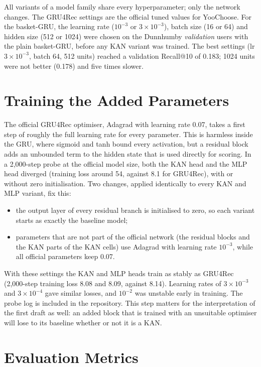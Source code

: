 All variants of a model family share every hyperparameter; only the network
changes. The GRU4Rec settings are the official tuned values for YooChoose. For
the basket-GRU, the learning rate ($10^{-3}$ or $3\times10^{-3}$), batch size (16
or 64) and hidden size (512 or 1024) were chosen on the Dunnhumby
\emph{validation} users with the plain basket-GRU, before any KAN variant was
trained. The best settings (lr $3\times10^{-3}$, batch 64, 512 units) reached a
validation Recall@10 of 0.183; 1024 units were not better (0.178) and five times
slower.

\section{Training the Added Parameters}
\label{sec:stability}

The official GRU4Rec optimiser, Adagrad with learning rate 0.07, takes a first
step of roughly the full learning rate for every parameter. This is harmless
inside the GRU, where sigmoid and tanh bound every activation, but a residual
block adds an unbounded term to the hidden state that is used directly for
scoring. In a 2,000-step probe at the official model size, both the KAN head and
the MLP head diverged (training loss around 54, against 8.1 for GRU4Rec), with or
without zero initialisation. Two changes, applied identically to every KAN and
MLP variant, fix this:

\begin{itemize}
    \item the output layer of every residual branch is initialised to zero, so
          each variant starts as exactly the baseline model;
    \item parameters that are not part of the official network (the residual
          blocks and the KAN parts of the KAN cells) use Adagrad with learning
          rate $10^{-3}$, while all official parameters keep 0.07.
\end{itemize}

With these settings the KAN and MLP heads train as stably as GRU4Rec
(2,000-step training loss 8.08 and 8.09, against 8.14). Learning rates of
$3 \times 10^{-3}$ and $3 \times 10^{-4}$ gave similar losses, and $10^{-2}$ was
unstable early in training. The probe log is included in the repository.
This step matters for the interpretation of the first draft as well: an
added block that is trained with an unsuitable optimiser will lose to its
baseline whether or not it is a KAN.

\section{Evaluation Metrics}

